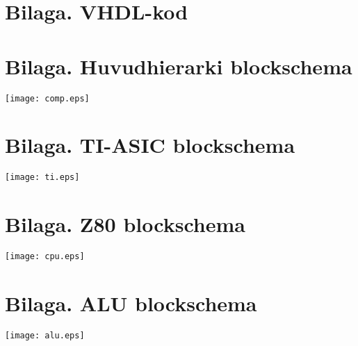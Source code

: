 \documentclass[main.tex]{subfiles}
\begin{document}
\appendix
\section{Bilaga. VHDL-kod}


\newpage
\recalctypearea
\vspace*{-10mm}
\section{Bilaga. Huvudhierarki blockschema}
\begin{minipage}{\textwidth}
    \texttt{[image: comp.eps]}
\end{minipage}
\vspace*{-10mm}
\section{Bilaga. TI-ASIC blockschema}
\begin{minipage}{\textwidth}
    \texttt{[image: ti.eps]}
\end{minipage}
\vspace*{-10mm}
\section{Bilaga. Z80 blockschema}
\begin{minipage}{\textwidth}
    \vspace{-2mm}
    \hspace{-15mm}
    \texttt{[image: cpu.eps]}
\end{minipage}
\vspace*{-10mm}
\section{Bilaga. ALU blockschema}
\begin{minipage}{\textwidth}
    \texttt{[image: alu.eps]}
\end{minipage}
\newpage
\recalctypearea
\end{document}
